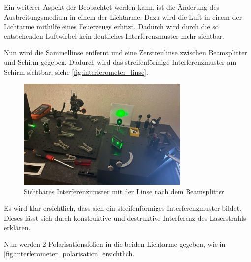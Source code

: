 \documentclass[12pt,english,ngerman]{scrartcl}
\begin{document}
Ein weiterer Aspekt der Beobachtet werden kann, ist die Änderung des
Ausbreitungsmedium in einem der Lichtarme. Dazu wird die Luft in einem der
Lichtarme mithilfe eines Feuerzeugs erhitzt. Dadurch wird durch die so
entstehenden Luftwirbel kein deutliches Interferenzmuster mehr sichtbar.

Nun wird die Sammellinse entfernt und eine Zerstreulinse zwischen Beamsplitter
und Schirm gegeben. Dadurch wird das streifenförmige Interferenzmuster am
Schirm sichtbar, siehe \autoref{fig:interferometer_linse}.

\begin{figure}[H]
	\begin{center}
		\includegraphics[width =0.75\textwidth]{./figures/Interferometer_linse.JPG}
	\end{center}
	\caption[Sichtbares Interferenzmuster mit der Linse nach dem Beamsplitter] { Sichtbares
		Interferenzmuster mit der Linse nach dem Beamsplitter
	}\label{fig:interferometer_linse}
\end{figure}

Es wird klar ersichtlich, dass sich ein streifenförmiges Interferenzmuster
bildet. Dieses lässt sich durch konstruktive und destruktive Interferenz des
Laserstrahls erklären.

Nun werden 2 Polarisationsfolien in die beiden Lichtarme gegeben, wie in
\autoref{fig:interferometer_polarisation} ersichtlich.
\end{document}
